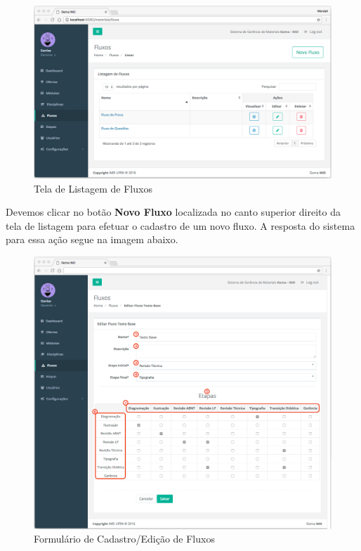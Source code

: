 \begin{figure}[H]
\centering
     \includegraphics[width=1.0\textwidth]{Screens/FlowsList.png}
      \caption{Tela de Listagem de Fluxos}
       \label{fig:scFlowsList}
\end{figure}

Devemos clicar no botão \textbf{Novo Fluxo} localizada no canto superior direito da tela de listagem para efetuar o cadastro de um novo fluxo. A resposta do sistema para essa ação segue na imagem abaixo.

\begin{figure}[H]
\centering
     \includegraphics[width=1.0\textwidth]{Screens/FlowsForm.png}
      \caption{Formulário de Cadastro/Edição de Fluxos}
       \label{fig:scFlowsForm}
\end{figure}

